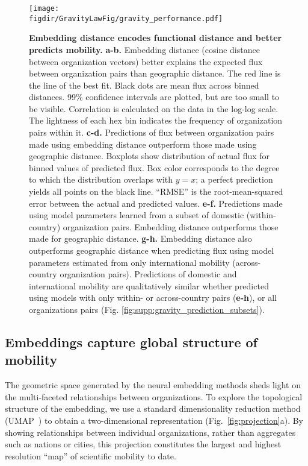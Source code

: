 \documentclass[12pt]{article} %
\def\figdir{../Figs}
\begin{document}
%
%
\begin{figure}[h!]
	\centering
	\texttt{[image: \\figdir/GravityLawFig/gravity\_performance.pdf]}
	\caption{
		\textbf{Embedding distance encodes functional distance and better predicts mobility.}
		\textbf{a-b.} Embedding distance (cosine distance between organization vectors) better explains the expected flux between organization pairs than geographic distance.
		The red line is the line of the best fit.
		Black dots are mean flux across binned distances.
		99\% confidence intervals are plotted, but are too small to be visible.
		Correlation is calculated on the data in the log-log scale. 
		The lightness of each hex bin indicates the frequency of organization pairs within it.
		\textbf{c-d.} Predictions of flux between organization pairs made using embedding distance outperform those made using geographic distance.
		Boxplots show distribution of actual flux for binned values of predicted flux.
		Box color corresponds to the degree to which the distribution overlaps with $y = x$;
		a perfect prediction yields all points on the black line.
		``RMSE'' is the root-mean-squared error between the actual and predicted values.
		\textbf{e-f.} Predictions made using model parameters learned from a subset of domestic (within-country) organization pairs.
		Embedding distance outperforms those made for geographic distance.
		\textbf{g-h.} Embedding distance also outperforms geographic distance when predicting flux using model parameters estimated from only international mobility (across-country organization pairs).
		Predictions of domestic and international mobility are qualitatively similar whether predicted using models with only within- or across-country pairs (\textbf{e-h}), or all organizations pairs (Fig. \ref{fig:supp:gravity_prediction_subsets}).
	}
	\label{fig:gravity_performance}
\end{figure}


\subsection*{Embeddings capture global structure of mobility}

The geometric space generated by the neural embedding methods sheds light on the multi-faceted relationships between organizations. To explore the topological structure of the embedding, we use a standard dimensionality reduction method (UMAP~\autocite{mcinnes2018umap}) to obtain a two-dimensional representation (Fig.~\ref{fig:projection}a).
By showing relationships between individual organizations, rather than aggregates such as nations or cities, this projection constitutes the largest and highest resolution ``map'' of scientific mobility to date.
\end{document}
